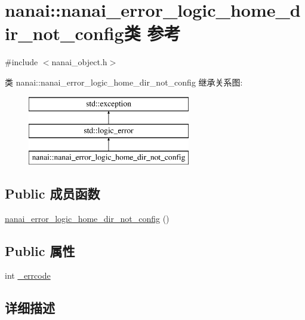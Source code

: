 \hypertarget{classnanai_1_1nanai__error__logic__home__dir__not__config}{}\section{nanai\+:\+:nanai\+\_\+error\+\_\+logic\+\_\+home\+\_\+dir\+\_\+not\+\_\+config类 参考}
\label{classnanai_1_1nanai__error__logic__home__dir__not__config}


{\ttfamily \#include $<$nanai\+\_\+object.\+h$>$}

类 nanai\+:\+:nanai\+\_\+error\+\_\+logic\+\_\+home\+\_\+dir\+\_\+not\+\_\+config 继承关系图\+:\begin{figure}[H]
\begin{center}
\leavevmode
\includegraphics[height=3.000000cm]{classnanai_1_1nanai__error__logic__home__dir__not__config}
\end{center}
\end{figure}
\subsection*{Public 成员函数}
\begin{DoxyCompactItemize}
\item 
\hyperlink{classnanai_1_1nanai__error__logic__home__dir__not__config_a8419fcfc218bb7ec2522eee55fdc6870}{nanai\+\_\+error\+\_\+logic\+\_\+home\+\_\+dir\+\_\+not\+\_\+config} ()
\end{DoxyCompactItemize}
\subsection*{Public 属性}
\begin{DoxyCompactItemize}
\item 
int \hyperlink{classnanai_1_1nanai__error__logic__home__dir__not__config_a9bda795d3a757430411d101bbf9a2df4}{\+\_\+errcode}
\end{DoxyCompactItemize}


\subsection{详细描述}


